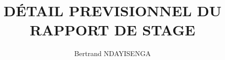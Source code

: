 \documentclass[a4paper,10pt]{report}
\title{DÉTAIL PREVISIONNEL DU RAPPORT DE STAGE}
\author{Bertrand NDAYISENGA}
\date{}
\begin{document}
\begin{abstract}
\end{abstract}
\end{document}
